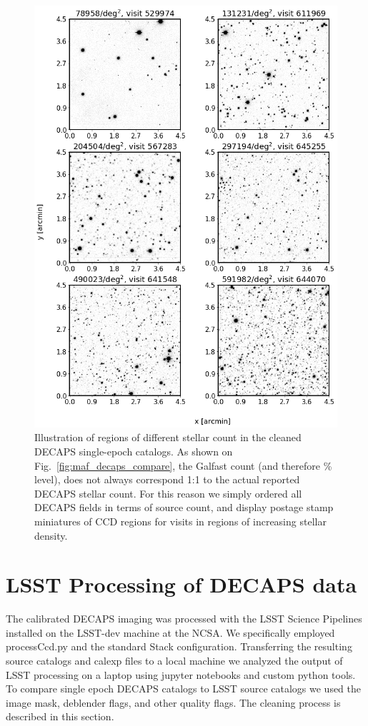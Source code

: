 \documentclass[DM,lsstdraft,toc,usenatbib]{lsstdoc}
\begin{document}
\begin{figure}
\begin{centering}
\includegraphics[width=0.85\columnwidth]{figs/Illustrate_densities_DECAPS.png}
\caption{Illustration of regions of different stellar count in the cleaned DECAPS single-epoch catalogs. As shown on Fig.~\ref{fig:maf_decaps_compare}, the Galfast count (and therefore \% level), does not always correspond 1:1 to the actual reported DECAPS stellar count. For this reason we simply ordered all DECAPS fields in terms of source count, and display postage stamp miniatures of CCD regions for visits in regions of increasing stellar density. }
\label{fig:decaps_illustrate_densities}
\end{centering}
\end{figure} 




\section{LSST Processing of DECAPS data}
\label{sec:LSST}
The calibrated DECAPS imaging was processed with the LSST Science Pipelines installed on the LSST-dev machine at the NCSA.  We specifically employed processCcd.py and the standard Stack configuration. Transferring the resulting source catalogs and calexp files to a local machine we analyzed the output of LSST processing on a laptop using jupyter notebooks and custom python tools. 
To compare single epoch DECAPS catalogs to LSST source catalogs we used the image mask, deblender flags, and other quality flags. The cleaning process is described in this section. 
\end{document}
